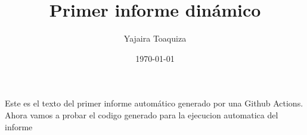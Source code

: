 \usepackage{amsmath, float}
\title{Primer informe dinámico}
\author{Yajaira Toaquiza}
\date{\today}



\maketitle
Este es el texto del primer informe automático generado por una Github Actions.
Ahora vamos a probar el codigo generado para la ejecucion automatica del informe
